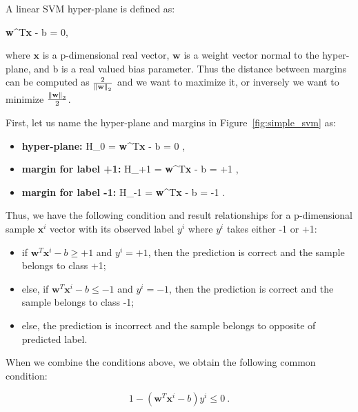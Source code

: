 A linear SVM hyper-plane is defined as:

\be
\label{eq:linear_hyperplane}
\textbf{w}^{T}\textbf{x} - b = 0,
\ee

where $\textbf{x}$ is a p-dimensional real vector, $\textbf{w}$ is a weight vector normal to the hyper-plane, and b is a real valued bias parameter. Thus the distance between margins can be computed as $\frac{2}{\left\lVert\textbf{w}\right\rVert_{2}}$ and we want to maximize it, or inversely we want to minimize $\frac{\left\lVert\textbf{w}\right\rVert_{2}}{2}$.


First, let us name the hyper-plane and margins in Figure~\ref{fig:simple_svm} as:

\begin{itemize}
    \item \textbf{hyper-plane:} 
    \be \label{h0_formula} H_{0} = \textbf{w}^{T}\textbf{x} - b = 0 \:,\ee
    \item \textbf{margin for label +1:}
    \be \label{h+1_formula} H_{+1} = \textbf{w}^{T}\textbf{x} - b = +1 \:,\:\ee
    \item \textbf{margin for label -1:}
    \be \label{h-1_formula} H_{-1} = \textbf{w}^{T}\textbf{x} - b = -1 \:.\ee
\end{itemize}

Thus, we have the following condition and result relationships for a p-dimensional sample $\textbf{x}^{i}$ vector with its observed label $y^{i}$ where $y^{i}$ takes either -1 or +1:

\begin{itemize}
    \item if $\textbf{w}^{T}\textbf{x}^{i} - b \geq +1$ and $y^{i} = +1$, then the prediction is correct and the sample belongs to class +1;
    \item else, if $\textbf{w}^{T}\textbf{x}^{i} - b \leq -1$ and $y^{i} = -1$, then the prediction is correct and the sample belongs to class -1;
    \item else, the prediction is incorrect and the sample belongs to opposite of predicted label.
\end{itemize}

When we combine the conditions above, we obtain the following common condition:

\begin{equation}
\label{common_loss} 
1 - (\textbf{w}^{T}\textbf{x}^{i} - b)y^{i} \leq 0\:.
\end{equation}

